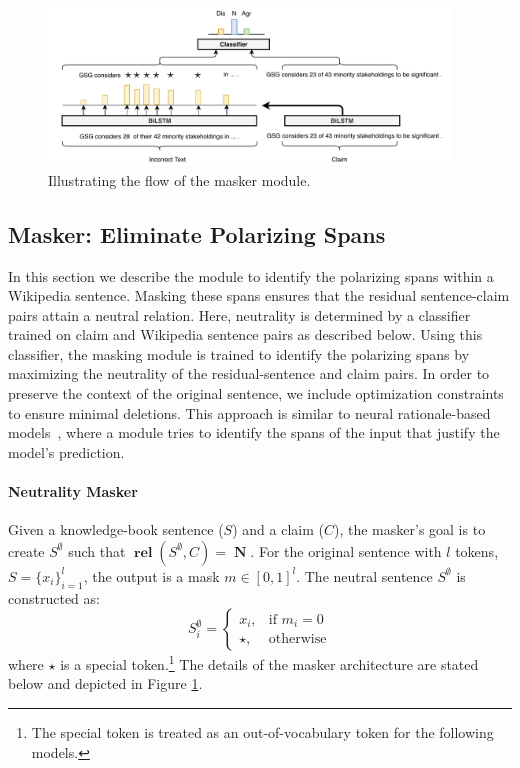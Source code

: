 \documentclass[letterpaper]{article}
\newcommand{\figref}[1]{Figure \ref{#1}}
\DeclareMathOperator{\rel}{\boldsymbol{rel}}
\DeclareMathOperator{\N}{\boldsymbol{N}}
\begin{document}
\begin{figure}[!t]
\centering
\includegraphics[width=0.95\textwidth]{mask_gen.pdf}
\caption{Illustrating the flow of the masker module.
}\label{fig:mask_gen}
\end{figure}
\subsection{Masker: Eliminate Polarizing Spans} \label{sec:mask_gen}

In this section we describe the module to identify the polarizing spans within a Wikipedia sentence. Masking these spans ensures that the residual sentence-claim pairs attain a neutral relation. Here, neutrality is determined by a classifier trained on claim and Wikipedia sentence pairs as described below. Using this classifier, the masking module is trained to identify the polarizing spans by maximizing the neutrality of the residual-sentence and claim pairs. In order to preserve the context of the original sentence, we include optimization constraints to ensure minimal deletions. This approach is similar to neural rationale-based models~\cite{lei-rational}, where a module tries to identify the spans of the input that justify the model's prediction.


\paragraph{Neutrality Masker} Given a knowledge-book sentence ($S$) and a claim ($C$), the masker's goal is to create $S^{\emptyset}$ such that $\rel(S^{\emptyset},C) = \N$. For the original sentence with $l$ tokens, $S = \{x_i\}_{i=1}^{l}$, the output is a mask $m\in[0,1]^l$. The neutral sentence $S^{\emptyset}$ is constructed as:
\begin{equation}
  {S^\emptyset_i}=\begin{cases}
    x_i, & \text{if $m_i=0$}\\
    \star, & \text{otherwise}
  \end{cases}
\end{equation}
where $\star$ is a special token.\footnote{The special token is treated as an out-of-vocabulary token for the following models.} The details of the masker architecture are stated below and depicted in \figref{fig:mask_gen}.
\end{document}
